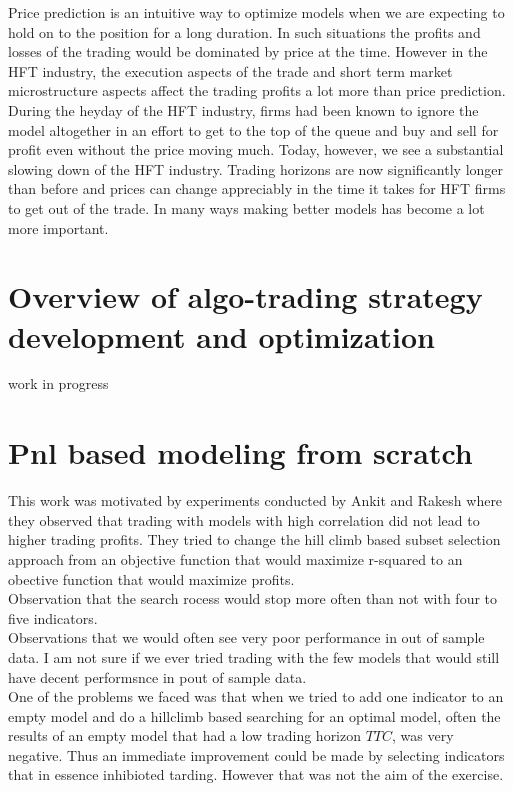 \documentclass[a4paper]{article}
\begin{document}
Price prediction is an intuitive way to optimize models when we are expecting to hold on to the position for a long duration. In such situations the profits and losses of the trading would be dominated by price at the time. However in the HFT industry, the execution aspects of the trade and short term market microstructure aspects affect the trading profits a lot more than price prediction. During the heyday of the HFT industry, firms had been known to ignore the model altogether in an effort to get to the top of the queue and buy and sell for profit even without the price moving much. Today, however, we see a substantial slowing down of the HFT industry. Trading horizons are now significantly longer than before and prices can change appreciably in the time it takes for HFT firms to get out of the trade. In many ways making better models has become a lot more important.

\section{Overview of algo-trading strategy development and
  optimization}
\label{sec:overview}
work in progress

\section{Pnl based modeling from scratch}
\label{sec:ankit-work1}
This work was motivated by experiments conducted by Ankit and Rakesh
where they observed that trading with models with high correlation did
not lead to higher trading profits. They tried to change the hill
climb based subset selection approach from an objective function that
would maximize r-squared to an obective function that would maximize
profits.\\
Observation that the search rocess would stop more often than not with
four to five indicators.\\
Observations that we would often see very poor performance in out of
sample data. I am not sure if we ever tried trading with the few
models that would still have decent performsnce in pout of sample
data.\\
One of the problems we faced was that when we tried to add one
indicator to an empty model and do a hillclimb based searching for an
optimal model, often the results of an empty model that had a low
trading horizon \(TTC\), was very negative. Thus an immediate
improvement could be made by selecting indicators that in essence
inhibioted tarding. However that was not the aim of the exercise.
\end{document}
